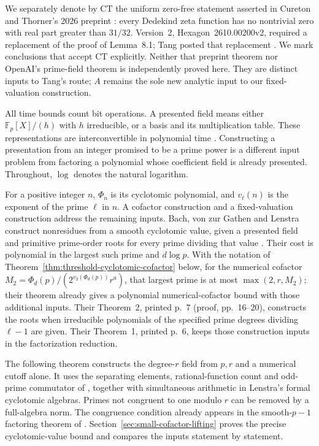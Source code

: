 \documentclass[11pt]{article}
\newcommand{\F}{\mathbb F}
\theoremstyle{definition}
\theoremstyle{remark}
\begin{document}
We separately denote by \(\mathrm{CT}\) the uniform zero-free statement
asserted in Cureton and Thorner's 2026 preprint
\citep[Theorem~1.1, p.~3]{CT2026}: every Dedekind zeta function has
no nontrivial zero with real part greater than \(31/32\).
Version~2, Hexagon~2610.00200v2, required a replacement of the proof
of Lemma~8.1; Tang posted that replacement
\citep[Remark~1.3, p.~2]{Tang2026,TangCTReview2026}.
We mark conclusions that accept \(\mathrm{CT}\) explicitly.
Neither that preprint theorem nor OpenAI's prime-field theorem is
independently proved here. They are distinct inputs to Tang's route;
\(A\) remains the sole new analytic input to our fixed-valuation
construction.

All time bounds count bit operations.  A presented field means either
$\F_p[X]/(h)$ with $h$ irreducible, or a basis and its multiplication
table.  These representations are interconvertible in polynomial time
\citep[Theorem~(1.1), pp.~329--330]{Lenstra1991}.
Constructing a presentation from an integer promised to be a prime power
is a different input problem from factoring a polynomial whose coefficient
field is already presented.  Throughout, $\log$ denotes the natural logarithm.


For a positive integer \(n\), \(\Phi_n\) is its cyclotomic polynomial,
and \(v_\ell(n)\) is the exponent of the prime \(\ell\) in \(n\).
A cofactor construction and a fixed-valuation construction address the remaining inputs.
Bach, von zur Gathen and Lenstra construct nonresidues from a smooth
cyclotomic value, given a presented field and primitive prime-order
roots for every prime dividing that value
\citep[Theorem~3, printed p.~7; proof, pp.~20--24]{BGL2001}.
Their cost is polynomial in the largest such prime and \(d\log p\).
With the notation of Theorem~\ref{thm:threshold-cyclotomic-cofactor}
below, for the numerical cofactor
\(M_2=\Phi_d(p)/(2^{v_2(\Phi_d(p))}r^a)\), that largest
prime is at most \(\max(2,r,M_2)\); their theorem already gives
a polynomial numerical-cofactor bound with those additional inputs.
Their Theorem~2, printed p.~7 (proof, pp.~16--20), constructs the
roots when irreducible polynomials of the specified prime degrees
dividing \(\ell-1\) are given. Their Theorem~1, printed p.~6,
keeps those construction inputs in the factorization reduction.

The following theorem constructs the degree-\(r\) field from
\(p,r\) and a numerical cutoff alone. It uses the separating
elements, rational-function count and odd-prime commutator of
\citet[Proposition~(5.2), pp.~20--21; Sections~5.7--5.11,
pp.~22--23]{BGL2001}, together with simultaneous arithmetic in
Lenstra's formal cyclotomic algebras. Primes not congruent to one
modulo \(r\) can be removed by a full-algebra norm. The congruence
condition already appears in the smooth-\(p-1\) factoring theorem
of \citet[Theorem~1.5, author p.~6, journal p.~498]{IKRS2012}.
Section~\ref{sec:small-cofactor-lifting} proves the precise
cyclotomic-value bound and compares the inputs statement by statement.
\end{document}
